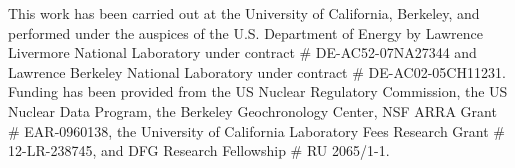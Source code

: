\documentclass[5p]{elsarticle}
\newcommand{\comment}[1]{\todo[color=blue!20!white,inline]{ASV: #1}}
\begin{document}
 This work has been carried out at the University of California, Berkeley, and performed under the auspices of the U.S. Department of Energy by Lawrence Livermore National Laboratory under contract \# DE-AC52-07NA27344 and Lawrence Berkeley National Laboratory under contract \# DE-AC02-05CH11231.
Funding has been provided from the US Nuclear Regulatory Commission, the US Nuclear Data Program, the Berkeley Geochronology Center, NSF ARRA Grant \# EAR-0960138, the University of California Laboratory Fees Research Grant \# 12-LR-238745, and  DFG Research Fellowship \# RU 2065/1-1.

 



% 
% 


% 
\end{document}
